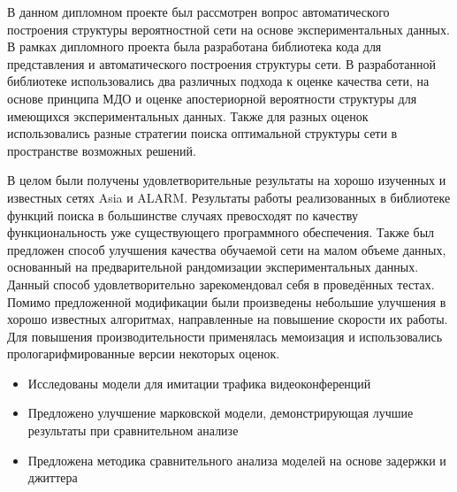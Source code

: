 
В данном дипломном проекте был рассмотрен вопрос автоматического построения структуры вероятностной сети на основе экспериментальных данных.
В рамках дипломного проекта была разработана библиотека кода для представления и автоматического построения структуры сети.
В разработанной библиотеке использовались два различных подхода к оценке качества сети, на основе принципа МДО и оценке апостериорной вероятности структуры для имеющихся экспериментальных данных.
Также для разных оценок использовались разные стратегии поиска оптимальной структуры сети в пространстве возможных решений.

В целом были получены удовлетворительные результаты на хорошо изученных и известных сетях Asia и ALARM.
Результаты работы реализованных в библиотеке функций поиска в большинстве случаях превосходят по качеству функциональность уже существующего программного обеспечения.
Также был предложен способ улучшения качества обучаемой сети на малом объеме данных, основанный на предварительной рандомизации экспериментальных данных.
Данный способ удовлетворительно зарекомендовал себя в проведённых тестах.
Помимо предложенной модификации были произведены небольшие улучшения в хорошо известных алгоритмах, направленные на повышение скорости их работы.
Для повышения производительности применялась мемоизация и использовались прологарифмированные версии некоторых оценок.

    \begin{itemize}
        \item Исследованы модели для имитации трафика видеоконференций
        \item Предложено улучшение марковской модели, демонстрирующая лучшие
            результаты при сравнительном анализе
        \item Предложена методика сравнительного анализа моделей
            на основе задержки и джиттера
    \end{itemize}
